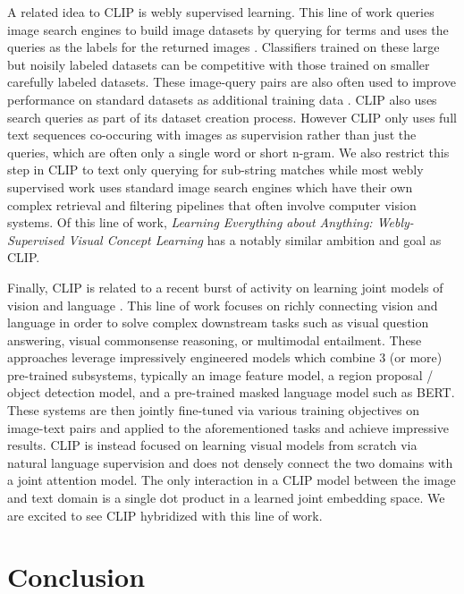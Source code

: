 \documentclass{article}
\begin{document}
A related idea to CLIP is webly supervised learning. This line of work queries image search engines to build image datasets by querying for terms and uses the queries as the labels for the returned images \citep{fergus2005learning}. Classifiers trained on these large but noisily labeled datasets can be competitive with those trained on smaller carefully labeled datasets. These image-query pairs are also often used to improve performance on standard datasets as additional training data \citep{chen2015webly}. CLIP also uses search queries as part of its dataset creation process. However CLIP only uses full text sequences co-occuring with images as supervision rather than just the queries, which are often only a single word or short n-gram. We also restrict this step in CLIP to text only querying for sub-string matches while most webly supervised work uses standard image search engines which have their own complex retrieval and filtering pipelines that often involve computer vision systems. Of this line of work, \textit{Learning Everything about Anything:
Webly-Supervised Visual Concept Learning} \citep{divvala2014learning} has a notably similar ambition and goal as CLIP.

Finally, CLIP is related to a recent burst of activity on learning joint models of vision and language \citep{lu2019vilbert,tan2019lxmert,chen2019uniter,li2020oscar,yu2020ernie}. This line of work focuses on richly connecting vision and language in order to solve complex downstream tasks such as visual question answering, visual commonsense reasoning, or multimodal entailment. These approaches leverage impressively engineered models which combine 3 (or more) pre-trained subsystems, typically an image feature model, a region proposal / object detection model, and a pre-trained masked language model such as BERT. These systems are then jointly fine-tuned via various training objectives on image-text pairs and applied to the aforementioned tasks and achieve impressive results. CLIP is instead focused on learning visual models from scratch via natural language supervision and does not densely connect the two domains with a joint attention model. The only interaction in a CLIP model between the image and text domain is a single dot product in a learned joint embedding space. We are excited to see CLIP hybridized with this line of work.







\section{Conclusion}
\end{document}
